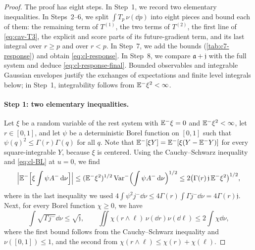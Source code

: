 \begin{proof}
The proof has eight steps. In Step~1, we record two elementary
inequalities. In Steps~2--6, we split $\int T_p\,\nu(\dd p)$ into eight
pieces and bound each of them: the remaining term of $T^{(1)}$, the two
terms of $T^{(2)}$, the first line of \eqref{eq:cav-T3}, the explicit
and score parts of its future-gradient term, and its last integral over
$r\ge p$ and over $r<p$. In Step~7, we add the bounds (\cref{tab:c7-response}) and obtain
\eqref{eq:cl-response}. In Step~8, we compare $\mathfrak a+\mathfrak j$
with the full system and deduce \eqref{eq:cl-response-final}. Bounded
observables and integrable Gaussian envelopes justify the exchanges of
expectations and finite level integrals below; in Step~1, integrability
follows from $\mathbb E^-\xi^2<\infty$.

\paragraph{Step 1: two elementary inequalities.}
Let $\xi$ be a random variable of the rest system with $\mathbb E^-\xi=0$ and
$\mathbb E^-\xi^2<\infty$, let $r\in[0,1]$, and let $\psi$ be a deterministic
Borel function on $[0,1]$ such that $\psi(q)^2\le\Gamma(r)\Gamma(q)$ for all
$q$. Note that $\mathbb E^-[\xi Y]=\mathbb E^-[\xi(Y-\mathbb E^-Y)]$ for every
square-integrable $Y$, because $\xi$ is centered. Using the
Cauchy--Schwarz inequality and \eqref{eq:cl-BL} at $u=0$, we find
\begin{equation}\label{eq:cl-CS}
 \Bigl|\mathbb E^-\Bigl[\xi\int\psi A^-\,\mathrm d\nu\Bigr]\Bigr|
 \le(\mathbb E^-\xi^2)^{1/2}\operatorname{Var}^-\Bigl(\int\psi A^-\,\mathrm d\nu\Bigr)^{1/2}
 \le2\bigl(\Gamma(r)\,\mathfrak j\,\mathbb E^-\xi^2\bigr)^{1/2},
\end{equation}
where in the last inequality we used
$4\int\psi^2j^-\dd\nu\le4\Gamma(r)\int\Gamma j^-\dd\nu=4\Gamma(r)\mathfrak j$.
Next, for every Borel function $\chi\ge0$, we have
\begin{equation}\label{eq:cl-min}
 \int\sqrt{\Gamma j^-}\dd\nu\le\sqrt{\mathfrak j},\qquad
 \iint\chi(r\wedge\ell)\,\nu(\dd r)\nu(\dd\ell)\le2\int\chi\dd\nu ,
\end{equation}
where the first bound follows from the Cauchy--Schwarz inequality and
$\nu([0,1])\le1$, and the second from
$\chi(r\wedge\ell)\le\chi(r)+\chi(\ell)$.


\end{proof}

